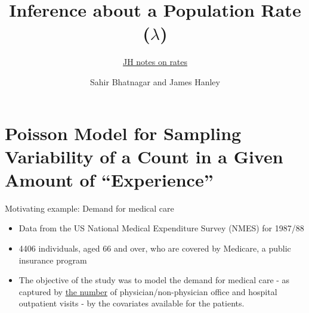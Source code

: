 \documentclass[handout]{beamer}\usepackage[]{graphicx}\usepackage[]{color}
\begin{document}




\title{Inference about a Population Rate ($\lambda$)}
\subtitle{\href{https://www.dropbox.com/s/b5q7vqo2ev6k2me/EPIB607intensity-model-inference-plan-2018.pdf?dl=0}{JH notes on rates}}
\author{Sahir Bhatnagar and James Hanley}


\maketitle

\section{Poisson Model for Sampling Variability of a Count in a Given Amount of ``Experience''}

\begin{frame}{Motivating example: Demand for medical care}

\begin{itemize}
	\setlength\itemsep{1em}
	\item Data from the US National Medical	Expenditure Survey (NMES) for 1987/88
	\item 4406 individuals, aged 66 and over, who are covered by Medicare, a public insurance program
	\item The objective of the study was to model the demand for medical care - as captured by \underline{the number} of physician/non-physician office and hospital outpatient visits - by the covariates available for the patients.
\end{itemize}

\end{frame}
\end{document}
